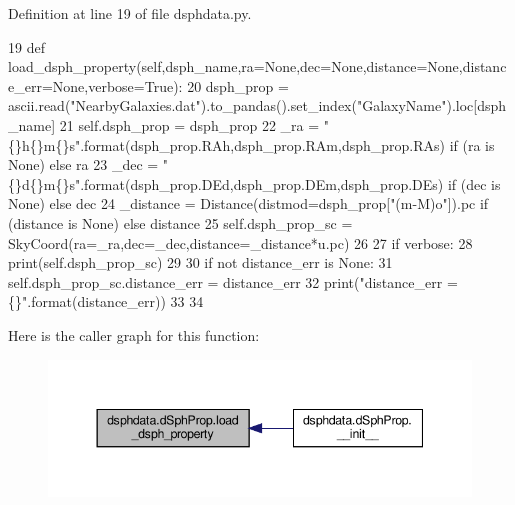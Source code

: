 Definition at line 19 of file dsphdata.\+py.


\begin{DoxyCode}
19     \textcolor{keyword}{def }load\_dsph\_property(self,dsph\_name,ra=None,dec=None,distance=None,distance\_err=None,verbose=True):
20         dsph\_prop = ascii.read(\textcolor{stringliteral}{"NearbyGalaxies.dat"}).to\_pandas().set\_index(\textcolor{stringliteral}{"GalaxyName"}).loc[dsph\_name]
21         self.dsph\_prop = dsph\_prop
22         \_ra  = \textcolor{stringliteral}{"\{\}h\{\}m\{\}s"}.format(dsph\_prop.RAh,dsph\_prop.RAm,dsph\_prop.RAs) \textcolor{keywordflow}{if} (ra  \textcolor{keywordflow}{is} \textcolor{keywordtype}{None}) \textcolor{keywordflow}{else} ra
23         \_dec = \textcolor{stringliteral}{"\{\}d\{\}m\{\}s"}.format(dsph\_prop.DEd,dsph\_prop.DEm,dsph\_prop.DEs) \textcolor{keywordflow}{if} (dec \textcolor{keywordflow}{is} \textcolor{keywordtype}{None}) \textcolor{keywordflow}{else} dec
24         \_distance = Distance(distmod=dsph\_prop[\textcolor{stringliteral}{"(m-M)o"}]).pc \textcolor{keywordflow}{if} (distance \textcolor{keywordflow}{is} \textcolor{keywordtype}{None}) \textcolor{keywordflow}{else} distance
25         self.dsph\_prop\_sc = SkyCoord(ra=\_ra,dec=\_dec,distance=\_distance*u.pc)
26         
27         \textcolor{keywordflow}{if} verbose:
28             print(self.dsph\_prop\_sc)
29         
30         \textcolor{keywordflow}{if} \textcolor{keywordflow}{not} distance\_err \textcolor{keywordflow}{is} \textcolor{keywordtype}{None}:
31             self.dsph\_prop\_sc.distance\_err = distance\_err
32             print(\textcolor{stringliteral}{"distance\_err = \{\}"}.format(distance\_err))
33         
34         
\end{DoxyCode}
Here is the caller graph for this function\+:\nopagebreak
\begin{figure}[H]
\begin{center}
\leavevmode
\includegraphics[width=344pt]{d7/dcd/classdsphdata_1_1dSphProp_a137f39efeed4c5ac45617e401d500a12_icgraph}
\end{center}
\end{figure}
\mbox{\label{classdsphdata_1_1dSphProp_a4a025a2eaf8f2a3c24f0cb78e82c046a}} 
